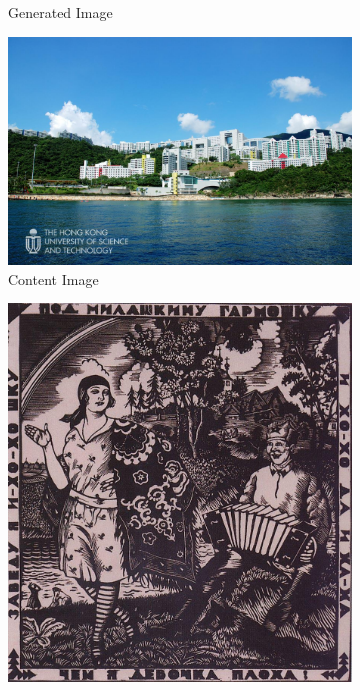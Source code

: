 \documentclass{article}
\begin{document}
\begin{figure}[ht]
\begin{minipage}{\textwidth}
\begin{subfigure}{0.25\textwidth}
            \caption{Generated Image}
        \end{subfigure}
    \end{minipage}
    
    \vspace{0.1cm}

    \begin{minipage}{\textwidth}
        \centering
        \begin{subfigure}{0.25\textwidth}
            \includegraphics[width=\textwidth]{./data_set/HKUST/6.jpeg}
            \caption{Content Image}
        \end{subfigure}
        \hfill %
        \begin{subfigure}{0.25\textwidth}
            \includegraphics[width=\textwidth]{./wikiart/Art_Nouveau_Modern/boris-kustodiev_under-honey-s-harmonica-1927.jpg}

\end{subfigure}
\end{minipage}
\end{figure}
\end{document}
